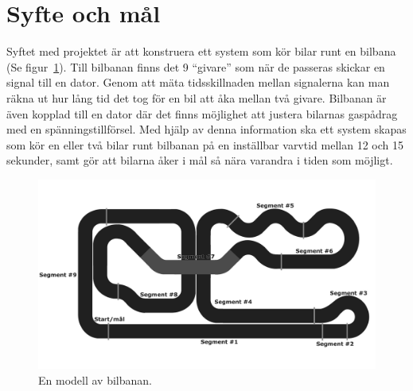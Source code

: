 \section{Syfte och mål}

Syftet med projektet är att konstruera ett system som kör bilar runt en
bilbana (Se figur~\ref{fig:track_modell}). Till bilbanan finns det 9 ``givare'' som när de passeras skickar en
signal till en dator. Genom att mäta tidsskillnaden mellan signalerna kan man räkna ut hur lång
tid det tog för en bil att åka mellan två givare. Bilbanan är även kopplad till
en dator där det finns möjlighet att justera bilarnas gaspådrag med en
spänningstillförsel. Med hjälp av denna information ska ett system skapas som
kör en eller två bilar runt bilbanan på en inställbar varvtid mellan 12 och 15
sekunder, samt gör att bilarna åker i mål så nära varandra i tiden som möjligt.

\begin{figure}
  \centering
  \includegraphics[width=\linewidth]{figures/BanaModell.pdf}
  \caption{En modell av bilbanan.}%
  \label{fig:track_modell}
\end{figure}
